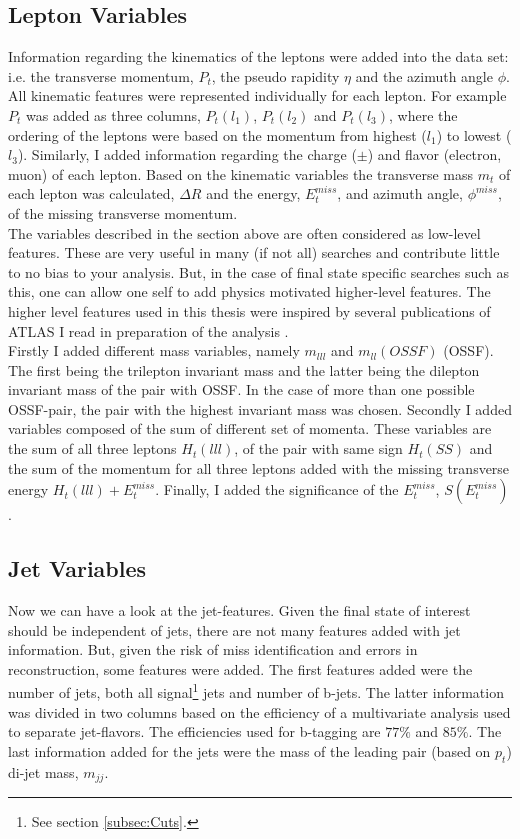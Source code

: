 \subsection{Lepton Variables}\label{subsec:LepSel}
Information regarding the kinematics of the leptons were added into the data set: i.e. the transverse momentum, $P_t$, the pseudo 
rapidity $\eta$ and the azimuth angle $\phi$. All kinematic features were represented individually for each lepton. For example $P_t$
was added as three columns, $P_t(l_1)$, $P_t(l_2)$ and $P_t(l_3)$, where the ordering of the leptons were based on the momentum from highest ($l_1$) to lowest ($l_3$).
Similarly, I added information regarding the charge ($\pm$) and flavor (electron, muon) of each lepton. Based on the kinematic variables
the transverse mass $m_t$ of each lepton was calculated, $\Delta R$ and the energy, $E_t^{miss}$, and azimuth angle, $\phi^{miss}$,
of the missing transverse momentum.
\\
The variables described in the section above are often considered as low-level features. These are very useful in many (if not all)
searches and contribute little to no bias to your analysis. But, in the case of final state specific searches such as this,
one can allow one self to add physics motivated higher-level features. The higher level features used in this thesis
were inspired by several publications of \ac{ATLAS} I read in preparation of the analysis \cite{franchini_search_2019, atlas_search_2021}. 
\\
Firstly I added different mass variables, namely $m_{lll}$ and $m_{ll}(OSSF)$ (\ac{OSSF}). The first being the trilepton invariant mass 
and the latter being the dilepton invariant mass of the pair with \ac{OSSF}. In the case of more than one possible \ac{OSSF}-pair,
the pair with the highest invariant mass was chosen. Secondly I added variables composed of the sum of different set of momenta.
These variables are the sum of all three leptons $H_t(lll)$, of the pair with same sign $H_t(SS)$ and the sum of the momentum
for all three leptons added with the missing transverse energy $H_t(lll) + E_t^{miss}$. Finally, I added the significance of the
$E_t^{miss}$, $S(E_t^{miss})$.
\subsection{Jet Variables}\label{subsec:JetSel}
Now we can have a look at the jet-features. Given the final state of interest should be independent of jets, there are not many
features added with jet information. But, given the risk of miss identification and errors in reconstruction, some features were 
added. The first features added were the number of jets, both all signal\footnote{See section \ref{subsec:Cuts}.} jets and number of b-jets.
The latter information was divided in two columns based on the efficiency of a multivariate analysis used to separate jet-flavors.
The efficiencies used for b-tagging are $77\%$ and $85\%$. The last information added for the jets were the mass of the leading pair 
(based on $p_t$) di-jet mass, $m_{jj}$.
